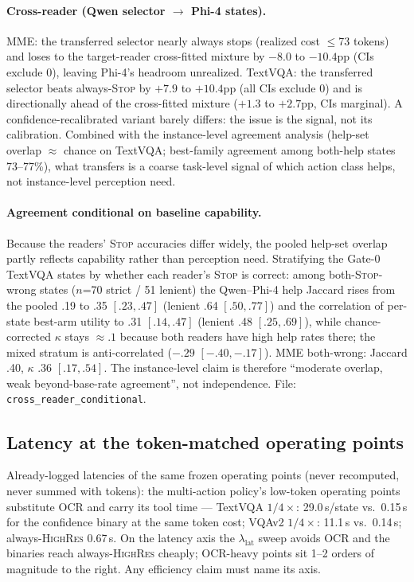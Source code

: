 \documentclass[10pt]{article}
\begin{document}
\paragraph{Cross-reader (Qwen selector $\to$ Phi-4 states).}
MME: the transferred selector nearly always stops (realized cost
$\le$73 tokens) and loses to the target-reader cross-fitted mixture by
$-8.0$ to $-10.4$pp (CIs exclude 0), leaving Phi-4's headroom unrealized.
TextVQA: the transferred selector beats always-\textsc{Stop} by $+7.9$ to
$+10.4$pp (all CIs exclude 0) and is directionally ahead of the
cross-fitted mixture ($+1.3$ to $+2.7$pp, CIs marginal). A
confidence-recalibrated variant barely differs: the issue is the signal,
not its calibration. Combined with the instance-level agreement analysis
(help-set overlap $\approx$ chance on TextVQA; best-family agreement among
both-help states 73--77\%), what transfers is a coarse task-level signal of
which action class helps, not instance-level perception need.

\paragraph{Agreement conditional on baseline capability.}
Because the readers' \textsc{Stop} accuracies differ widely, the pooled
help-set overlap partly reflects capability rather than perception need.
Stratifying the Gate-0 TextVQA states by whether each reader's \textsc{Stop}
is correct: among both-\textsc{Stop}-wrong states ($n$=70 strict / 51
lenient) the Qwen--Phi-4 help Jaccard rises from the pooled .19 to .35
$[.23, .47]$ (lenient .64 $[.50, .77]$) and the correlation of per-state
best-arm utility to .31 $[.14, .47]$ (lenient .48 $[.25, .69]$), while
chance-corrected $\kappa$ stays $\approx .1$ because both readers have high
help rates there; the mixed stratum is anti-correlated ($-.29$
$[-.40, -.17]$). MME both-wrong: Jaccard .40, $\kappa$ .36 $[.17, .54]$.
The instance-level claim is therefore ``moderate overlap, weak
beyond-base-rate agreement'', not independence. File:
\texttt{cross\_reader\_conditional}.

\subsection{Latency at the token-matched operating points}

Already-logged latencies of the same frozen operating points (never
recomputed, never summed with tokens): the multi-action policy's low-token
operating points substitute OCR and carry its tool time --- TextVQA
$1/4\times$: 29.0\,s/state vs.\ 0.15\,s for the confidence binary at the
same token cost; VQAv2 $1/4\times$: 11.1\,s vs.\ 0.14\,s; always-\textsc{HighRes}
0.67\,s. On the latency axis the $\lambda_{\text{lat}}$ sweep avoids OCR
and the binaries reach always-\textsc{HighRes} cheaply; OCR-heavy points
sit 1--2 orders of magnitude to the right. Any efficiency claim must name
its axis.
\end{document}
